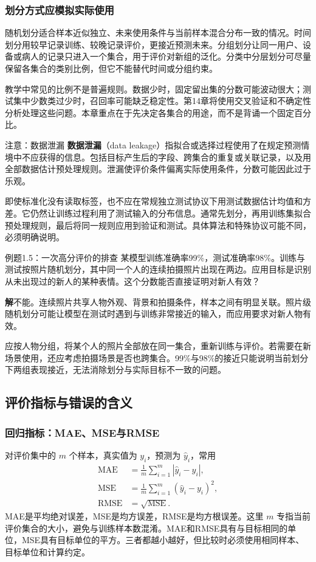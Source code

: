 \documentclass[UTF8,fontset=none,zihao=-4,a4paper]{ctexart}
\newcommand{\term}[1]{\textbf{#1}}
\newcommand{\sol}{\par\noindent\textbf{解}\quad}
\numberwithin{equation}{section}
\numberwithin{figure}{section}
\begin{document}
\subsubsection{划分方式应模拟实际使用}
随机划分适合样本近似独立、未来使用条件与当前样本混合分布一致的情况。时间划分用较早记录训练、较晚记录评价，更接近预测未来。分组划分让同一用户、设备或病人的记录只进入一个集合，用于评价对新组的泛化。分类中分层划分可尽量保留各集合的类别比例，但它不能替代时间或分组约束。

教学中常见的比例不是普遍规则。数据少时，固定留出集的分数可能波动很大；测试集中少数类过少时，召回率可能缺乏稳定性。第14章将使用交叉验证和不确定性分析处理这些问题。本章重点在于先决定各集合的用途，而不是背诵一个固定百分比。

\begin{infobox}{注意：数据泄漏}
\term{数据泄漏}（data leakage）指拟合或选择过程使用了在规定预测情境中不应获得的信息。包括目标产生后的字段、跨集合的重复或关联记录，以及用全部数据估计预处理规则。泄漏使评价条件偏离实际使用条件，分数可能因此过于乐观。
\end{infobox}
即使标准化没有读取标签，也不应在常规独立测试协议下用测试数据估计均值和方差。它仍然让训练过程利用了测试输入的分布信息。通常先划分，再用训练集拟合预处理规则，最后将同一规则应用到验证和测试。具体算法和特殊协议可能不同，必须明确说明。

\begin{infobox}{例题1.5：一次高分评价的排查}
某模型训练准确率99\%，测试准确率98\%。训练与测试按照片随机划分，其中同一个人的连续拍摄照片出现在两边。应用目标是识别从未出现过的新人的某种表情。这个分数能否直接证明对新人有效？
\end{infobox}
\sol 不能。连续照片共享人物外观、背景和拍摄条件，样本之间有明显关联。照片级随机划分可能让模型在测试时遇到与训练非常接近的输入，而应用要求对新人物有效。

应按人物分组，将某个人的照片全部放在同一集合，重新训练与评价。若需要在新场景使用，还应考虑拍摄场景是否也跨集合。99\%与98\%的接近只能说明当前划分下两组表现接近，无法消除划分与实际目标不一致的问题。

\subsection{评价指标与错误的含义}
\subsubsection{回归指标：MAE、MSE与RMSE}
对评价集中的 $m$ 个样本，真实值为 $y_i$，预测为 $\widehat y_i$，常用
\begin{align}
 \mathrm{MAE}&=\frac1m\sum_{i=1}^{m}|\widehat y_i-y_i|,\\
 \mathrm{MSE}&=\frac1m\sum_{i=1}^{m}(\widehat y_i-y_i)^2,\\
 \mathrm{RMSE}&=\sqrt{\mathrm{MSE}}.
\end{align}
MAE是平均绝对误差，MSE是均方误差，RMSE是均方根误差。这里 $m$ 专指当前评价集合的大小，避免与训练样本数混淆。MAE和RMSE具有与目标相同的单位，MSE具有目标单位的平方。三者都越小越好，但比较时必须使用相同样本、目标单位和计算约定。
\end{document}
